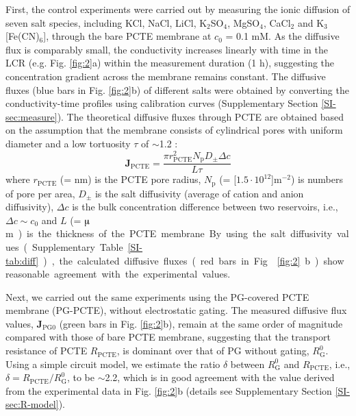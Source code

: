 \documentclass[journal=nalefd,email=true, hyperref=true, keywords=false]{achemso}
\newcommand{\Fig}{Fig.}
\begin{document}
First, the control experiments were carried out by measuring the ionic
diffusion of seven salt species, including KCl, NaCl, LiCl,
K$_{2}$SO$_{4}$, MgSO$_{4}$, CaCl$_{2}$ and K$_{3}$[Fe(CN)$_{6}$],
through the bare PCTE membrane at $c_{0}$ = 0.1 mM. As the diffusive
flux is comparably small, the conductivity increases linearly with
time in the LCR (e.g. \Fig{} \ref{fig:2}a) within the measurement
duration (1 h), suggesting the concentration gradient across the
membrane remains constant. The diffusive fluxes (blue bars in \Fig{}
\ref{fig:2}b) of different salts were obtained by converting the
conductivity-time profiles using calibration curves (Supplementary
Section \ref{SI-sec:measure}). The theoretical diffusive fluxes
through PCTE are obtained based on the assumption that the membrane
consists of cylindrical pores with uniform diameter and a low
tortuosity $\tau$ of $\sim{}$1.2 \cite{O_Hern_2012}:
\begin{equation}
  \label{eq:j-pcte}
  \boldsymbol{J}_{\mathrm{PCTE}} = \frac{\pi r_{\mathrm{PCTE}}^{2} N_{\mathrm{p}} D_{\mathrm{\pm}} \Delta c}{L \tau}
\end{equation}
{where $r_{\mathrm{PCTE}}$ (= \unit[200]{nm}) is the PCTE pore radius, $N_{\mathrm{p}}$  (= \unit[$1.5\cdot10^{12}$]{m$^{-2}$}) is
numbers of pore per area, $D_{\mathrm{\pm}}$ is the salt diffusivity
(average of cation and anion diffusivity), $\Delta c$ is the bulk
concentration difference between two reservoirs, i.e.,
$\Delta c \sim c_{0}$ and $L$ (= \unit[24]{$\muup$m}) is the thickness of the PCTE membrane.
By using the salt diffusivity values (Supplementary Table
\ref{SI-tab:diff}), the calculated diffusive fluxes (red bars in
\Fig{} \ref{fig:2}b) show reasonable agreement with the experimental
values.}

Next, we carried out the same experiments using the PG-covered PCTE
membrane (PG-PCTE), without electrostatic gating. The measured
diffusive flux values, $\boldsymbol{J}_{\mathrm{PG0}}$ (green bars in
\Fig{} \ref{fig:2}b), remain at the same order of magnitude compared
with those of bare PCTE membrane, suggesting that the transport
resistance of PCTE $R_{\mathrm{PCTE}}$, is dominant over that of PG
without gating, $R_{\mathrm{G}}^{0}$. Using a simple circuit model, we
estimate the ratio $\delta$ between $R_{\mathrm{G}}^{0}$ and
$R_{\mathrm{PCTE}}$, i.e.,
$\delta = R_{\mathrm{PCTE}}/R_{\mathrm{G}}^{0}$, to be $\sim$2.2,
which is in good agreement with the value derived from the
experimental data in \Fig{} \ref{fig:2}b (details see Supplementary
Section \ref{SI-sec:R-model}).
\end{document}
